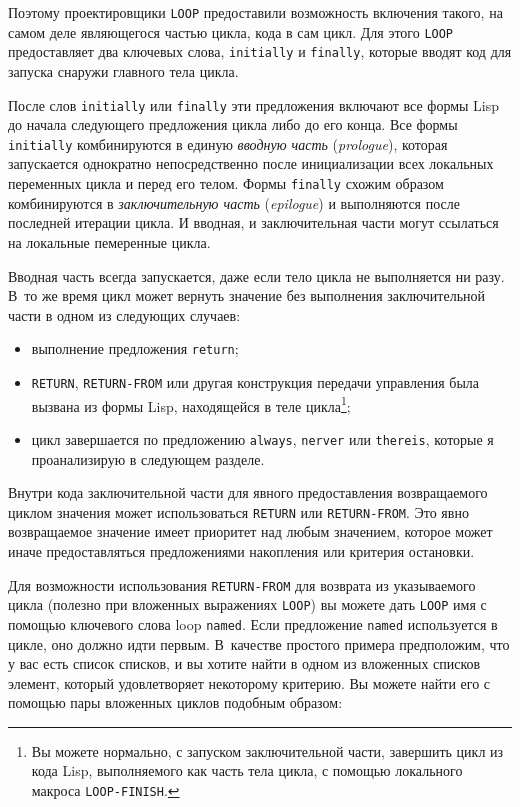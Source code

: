 Поэтому проектировщики \lstinline{LOOP} предоставили возможность включения такого, на самом
деле являющегося частью цикла, кода в сам цикл. Для этого \lstinline{LOOP} предоставляет два
ключевых слова, \lstinline{initially} и \lstinline{finally}, которые вводят код для запуска снаружи
главного тела цикла.

После слов \lstinline{initially} или \lstinline{finally} эти предложения включают все формы Lisp до
начала следующего предложения цикла либо до его конца. Все формы \lstinline{initially}
комбинируются в единую \textit{вводную часть} (\textit{prologue}), которая запускается
однократно непосредственно после инициализации всех локальных переменных цикла и перед его
телом. Формы \lstinline{finally} схожим образом комбинируются в \textit{заключительную часть}
(\textit{epilogue}) и выполняются после последней итерации цикла. И вводная, и
заключительная части могут ссылаться на локальные пемеренные цикла.

Вводная часть всегда запускается, даже если тело цикла не выполняется ни разу. В~то же
время цикл может вернуть значение без выполнения заключительной части в одном из следующих
случаев:
\begin{itemize}
\item выполнение предложения \lstinline{return};
\item \lstinline{RETURN}, \lstinline{RETURN-FROM} или другая конструкция передачи управления
  была вызвана из формы Lisp, находящейся в теле цикла\footnote{Вы можете нормально, с
    запуском заключительной части, завершить цикл из кода Lisp, вы\-пол\-няе\-мо\-го как часть
    тела цикла, с помощью локального макроса \lstinline{LOOP-FINISH}.}\hspace{\footnotenegspace};
\item цикл завершается по предложению \lstinline{always}, \lstinline{nerver} или \lstinline{thereis},
  которые я проанализирую в следующем разделе.
\end{itemize}

Внутри кода заключительной части для явного предоставления возвращаемого циклом значения
может использоваться \lstinline{RETURN} или \lstinline{RETURN-FROM}. Это явно возвращаемое
значение имеет приоритет над любым значением, которое может иначе предоставляться
предложениями накопления или критерия остановки.

Для возможности использования \lstinline{RETURN-FROM} для возврата из указываемого цикла
(полезно при вложенных выражениях \lstinline{LOOP}) вы можете дать \lstinline{LOOP} имя с
помощью ключевого слова loop \lstinline{named}. Если предложение \lstinline{named} используется в
цикле, оно должно идти первым. В~качестве простого примера предположим, что у вас есть
список списков, и вы хотите найти в одном из вложенных списков элемент, который
удовлетворяет некоторому критерию. Вы можете найти его с помощью пары вложенных циклов
подобным образом:

